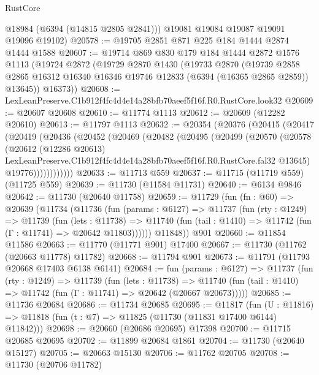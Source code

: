 \begin{lexlean}{RustCore}
\begin{coremodule}
        @18984
        (@6394 (@14815 @2805 @2841)))
      @19081
      @19084
      @19087
      @19091
      @19096
      @19102)
@20578 := @19705 @2851 @871 @225 @184 @1444 @2874 @1444 @1588
@20607 := @19714
    @869
    @830
    @179
    @184
    @1444
    @2872
    @1576
    @1113
    (@19724
      @2872
      (@19729
        @2870
        @1430
        (@19733
          @2870
          (@19739
            @2858
            @2865
            @16312
            @16340
            @16346
            @19746
            @12833
            (@6394 (@16365 @2865 @2859))
            @13645))
        @16373))
@20608 := LexLeanPreserve.C1b912f4fc4d4e14a28bfb70aeef5f16f.R0.RustCore.look32
@20609 := @20607 @20608
@20610 := @11774 @1113
@20612 := @20609 (@12282 @20610)
@20613 := @11797 @1113
@20632 := @20354
    (@20376
      (@20415
        (@20417
          (@20419
            (@20436
              (@20452
                (@20469
                  (@20482
                    (@20495
                      (@20499
                        (@20570
                          (@20578
                            (@20612
                              (@12286 @20613)
                              LexLeanPreserve.C1b912f4fc4d4e14a28bfb70aeef5f16f.R0.RustCore.fal32
                              @13645)
                            @19776))))))))))))
@20633 := @11713 @559
@20637 := @11715 (@11719 @559) (@11725 @559)
@20639 := @11730 (@11584 @11731)
@20640 := @6134 @9846
@20642 := @11730 (@20640 @11758)
@20659 := @11729
    (fun (fn : @60) =>
    @20639
      (@11734
        (@11736
          (fun (params : @6127) =>
          @11737
            (fun (rty : @1249) =>
            @11739
              (fun (lets : @11738) =>
              @11740 (fun (tail : @1410) => @11742 (fun (Γ : @11741) => @20642 @11803))))))
        @11848))
    @901
@20660 := @11854 @11586
@20663 := @11770 (@11771 @901) @17400
@20667 := @11730 (@11762 (@20663 @11778) @11782)
@20668 := @11794 @901
@20673 := @11791 (@11793 @20668 @17403 @6138 @6141)
@20684 := fun (params : @6127) =>
  @11737
    (fun (rty : @1249) =>
    @11739
      (fun (lets : @11738) =>
      @11740 (fun (tail : @1410) => @11742 (fun (Γ : @11741) => @20642 (@20667 @20673)))))
@20685 := @11736 @20684
@20686 := @11734 @20685
@20695 := @11817
    (fun (U : @11816) => @11818 (fun (t : @7) => @11825 (@11730 (@11831 @17400 @6144) @11842)))
@20698 := @20660 (@20686 @20695) @17398
@20700 := @11715 @20685 @20695
@20702 := @11899 @20684 @1861
@20704 := @11730 (@20640 @15127)
@20705 := @20663 @15130
@20706 := @11762 @20705
@20708 := @11730 (@20706 @11782)

\end{coremodule}
\end{lexlean}
